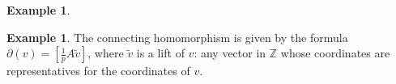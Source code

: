 \documentclass{amsart}[12pt]
\newcommand{\Nov}[1]{\textcolor{violet}{Lecture of November #1, 2021}}
\newcommand{\Z}{\mathbb{Z}}
\numberwithin{equation}{section}
\theoremstyle{plain} %
\newtheorem{thm}[equation]{Theorem}
\theoremstyle{definition}
\newtheorem{ex}[equation]{Example}
\theoremstyle{remark}
\newcommand{\xra}[1]{\xrightarrow{#1}}
\begin{document}
\begin{ex}
\begin{ex}
The connecting homomorphism is given by the formula $\partial(v) = [ \frac{1}{p} A \tilde{v} ]$, where $\tilde{v}$ is a lift of $v$: any vector in $\Z$ whose coordinates are representatives for the coordinates of $v$.
\end{ex}

\begin{comment}

\Nov{19}



\begin{thm}[Long exact sequence in homology]
 \label{lem121} If $0 \to M'_\bullet \xra{j} M_\bullet \xra{p} M''_\bullet\to 0$ is a short exact sequence of chain complexes of left $R$-modules,
  then there is a long exact sequence
      of left $R$-modules of the form
      $$
      \cdots \to H_i(M'_\bullet) \xra{H_i(j)} H_i(M_\bullet) \xra{H_i(p)} H_i(M''_\bullet) \xra{\color{red}{\partial_i}}
      H_{i-1}(M'_\bullet) \xra{H_{i-1}(j)} H_{i-1}(M_\bullet) \xra{H_{i-1}(p)} \cdots
      $$
      also often drawn as
      
     \begin{tikzpicture}[descr/.style={fill=white,inner sep=1.5pt}]
        \matrix (m) [
            matrix of math nodes,
            row sep=1em,
            column sep=2.5em,
            text height=1.5ex, text depth=0.25ex
        ]
        { \cdots & H_i(M'_\bullet) & H_i(M_\bullet) & H_i(M''_\bullet) \\
            & H_{i-1}(M'_\bullet) & H_{i-1}(M_\bullet) & H_{i-1}(M''_\bullet) \\
            & H_{i-2}(M'_\bullet) & H_{i-2}(M_\bullet) & H_{i-2}(M''_\bullet) \\
            & \mbox{}         &                 & \mbox{}         \\
            & H_0(M'_\bullet) & H_0(M_\bullet) & H_0(M''_\bullet) \ldots \\
        };

        \path[overlay,->, font=\scriptsize,>=latex]
        (m-1-1) edge (m-1-2)
        (m-1-2) edge (m-1-3)
        (m-1-3) edge (m-1-4)
        (m-1-4) edge[out=355,in=175,red] node[descr,yshift=0.3ex] {$\partial_i$} (m-2-2)
        (m-2-2) edge (m-2-3)
        (m-2-3) edge (m-2-4)
        (m-2-4) edge[out=355,in=175,red] node[descr,yshift=0.3ex] {$\partial_{i-1}$} (m-3-2)
        (m-3-2) edge (m-3-3)
        (m-3-3) edge (m-3-4)
        (m-3-4) edge[out=355,in=175,dashed,red] (m-5-2)
        (m-5-2) edge (m-5-3)
        (m-5-3) edge (m-5-4);
\end{tikzpicture}
    

\end{comment}
\end{ex}
\end{document}
